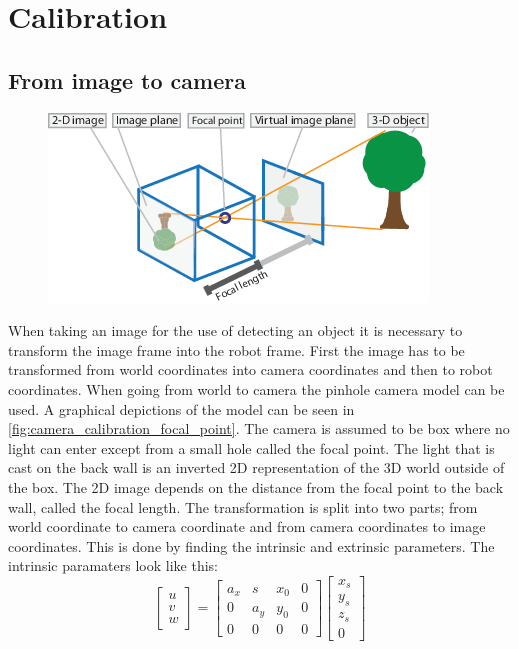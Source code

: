 \chapter{Calibration}

\section{From image to camera}
\begin{figure}[h]
\centering
\includegraphics[width=\textwidth]{figures/camera_calibration_focal_point.png}
\caption{}
\label{fig:camera_calibration_focal_point}
\end{figure}
When taking an image for the use of detecting an object it is necessary to transform the image frame into the robot frame. First the image has to be transformed from world coordinates into camera coordinates and then to robot coordinates. When going from world to camera the pinhole camera model can be used. A graphical depictions of the model can be seen in \autoref{fig:camera_calibration_focal_point}. The camera is assumed to be box where no light can enter except from a small hole called the focal point. The light that is cast on the back wall is an inverted 2D representation of the 3D world outside of the box. The 2D image depends on the distance from the focal point to the back wall, called the focal length. The transformation is split into two parts; from world coordinate to camera coordinate and from camera coordinates to image coordinates. This is done by finding the intrinsic and extrinsic parameters. The intrinsic paramaters look like this:
\begin{equation}
\begin{bmatrix}
u \\
v \\
w 
\end{bmatrix} 
 =
\begin{bmatrix}
a_x & s & x_0 & 0 \\
0 & a_y & y_0 & 0 \\
0 & 0 & 0 & 0 
\end{bmatrix}  
\begin{bmatrix}
x_s \\
y_s \\
z_s \\
0 
\end{bmatrix}
\end{equation}

